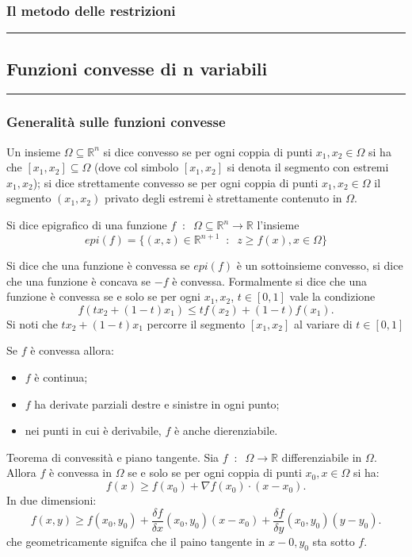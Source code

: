 \subsubsection{Il metodo delle restrizioni}

\rule{\textwidth}{2pt}
\subsection{Funzioni convesse di n variabili}
\rule{\textwidth}{0.4pt}
\subsubsection{Generalità sulle funzioni convesse}
Un insieme $\Omega \subseteq \mathbb{R}^n$ si dice convesso se per ogni coppia di punti $x_1, x_2 \in \Omega$ si ha che $[x_1,x_2]\subseteq \Omega$ (dove col simbolo $[x_1,x_2]$ si denota il segmento con estremi $x_1,x_2$); si dice strettamente convesso se per ogni coppia di punti $x_1,x_2 \in \Omega$ il segmento $(x_1,x_2)$ privato degli estremi è strettamente contenuto in $\Omega$.\newline

Si dice epigrafico di una funzione $f \;\;:\;\; \Omega \subseteq \mathbb{R}^n \rightarrow  \mathbb{R}$ l'insieme
\[
    epi(f)=\{(x,z) \in \mathbb{R}^{n+1} \;\;:\;\; z\geq f(x), x \in\Omega\}
\]
\newline

Si dice che una funzione è convessa se $epi(f)$ è un sottoinsieme convesso, si dice che una funzione è concava se $-f$ è convessa.\newline
Formalmente si dice che una funzione è convessa se e solo se per ogni $x_1,x_2$, $t \in [0,1]$ vale la condizione
\[
    f(tx_2 + (1-t)x_1) \leq tf(x_2) + (1-t)f(x_1).
\]
Si noti che $tx_2 + (1-t)x_1$ percorre il segmento $[x_1,x_2]$ al variare di $t \in[0,1]$\newline

Se $f$ è convessa allora:
\begin{itemize}
    \item $f$ è continua;
    \item $f$ ha derivate parziali destre e sinistre in ogni punto;
    \item nei punti in cui è derivabile, $f$ è anche dierenziabile.
\end{itemize}

Teorema di convessità e piano tangente. Sia $f \;\;:\;\; \Omega \rightarrow \mathbb{R}$ differenziabile in $\Omega$. Allora $f$ è convessa in $\Omega$ se e solo se per ogni coppia di punti $x_0, x \in \Omega$ si ha:
\[
    f(x) \geq f(x_0) + \nabla f(x_0) \cdot (x-x_0).
\]
In due dimensioni:
\[
    f(x,y) \geq f(x_0,y_0) + \frac{\delta f}{\delta x}(x_0,y_0)(x-x_0)+\frac{\delta f}{\delta y}(x_0, y_0)(y-y_0).
\]
che geometricamente signifca che il paino tangente in $x-0, y_0$ sta sotto $f$.\newline

